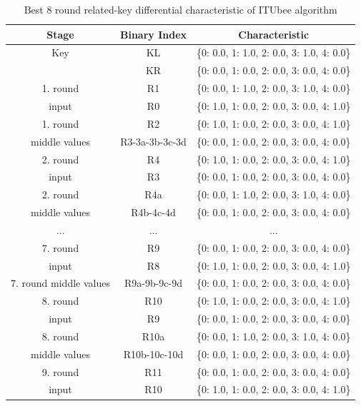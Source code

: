 \documentclass{beamer}
\begin{document}
\begin{frame}

\begin{table}[ht]
    \footnotesize
    \centering
    \begin{tabular}{|c|c|c|}
        \hline
        \textbf{Stage} & \textbf{Binary Index} & \textbf{Characteristic} \\
        \hline
        Key  & KL & \{0: 0.0, 1: 1.0, 2: 0.0, 3: 1.0, 4: 0.0\} \\
                     & KR & \{0: 0.0, 1: 0.0, 2: 0.0, 3: 0.0, 4: 0.0\} \\
        \hline
        1. round  & R1 & \{0: 0.0, 1: 1.0, 2: 0.0, 3: 1.0, 4: 0.0\} \\
        input     & R0 & \{0: 1.0, 1: 0.0, 2: 0.0, 3: 0.0, 4: 1.0\} \\
        \hline
        1. round  & R2 & \{0: 1.0, 1: 0.0, 2: 0.0, 3: 0.0, 4: 1.0\} \\
        middle values & R3-3a-3b-3c-3d & \{0: 0.0, 1: 0.0, 2: 0.0, 3: 0.0, 4: 0.0\} \\     
        \hline
        2. round  & R4 & \{0: 1.0, 1: 0.0, 2: 0.0, 3: 0.0, 4: 1.0\} \\
        input     & R3 & \{0: 0.0, 1: 0.0, 2: 0.0, 3: 0.0, 4: 0.0\} \\
        \hline
        2. round  & R4a & \{0: 0.0, 1: 1.0, 2: 0.0, 3: 1.0, 4: 0.0\} \\
        middle values & R4b-4c-4d & \{0: 0.0, 1: 0.0, 2: 0.0, 3: 0.0, 4: 0.0\} \\
                      
        \hline
        ...  & ... & ... \\
        
                     
        \hline
        7. round  & R9 & \{0: 0.0, 1: 0.0, 2: 0.0, 3: 0.0, 4: 0.0\} \\
        input     & R8 & \{0: 1.0, 1: 0.0, 2: 0.0, 3: 0.0, 4: 1.0\} \\
        \hline
        7. round middle values & R9a-9b-9c-9d & \{0: 0.0, 1: 0.0, 2: 0.0, 3: 0.0, 4: 0.0\} \\
        \hline
        8. round  & R10 & \{0: 1.0, 1: 0.0, 2: 0.0, 3: 0.0, 4: 1.0\} \\
        input      & R9  & \{0: 0.0, 1: 0.0, 2: 0.0, 3: 0.0, 4: 0.0\} \\
        \hline
        8. round  & R10a & \{0: 0.0, 1: 1.0, 2: 0.0, 3: 1.0, 4: 0.0\} \\
        middle values & R10b-10c-10d & \{0: 0.0, 1: 0.0, 2: 0.0, 3: 0.0, 4: 0.0\} \\
                      
        \hline
        9. round & R11 & \{0: 0.0, 1: 0.0, 2: 0.0, 3: 0.0, 4: 0.0\} \\
        input     & R10 & \{0: 1.0, 1: 0.0, 2: 0.0, 3: 0.0, 4: 1.0\} \\
        \hline
    \end{tabular}
    \caption{Best 8 round related-key differential characteristic of ITUbee algorithm}
    \label{tab:RelatedKeyDif}
\end{table}

\end{frame}
\end{document}
